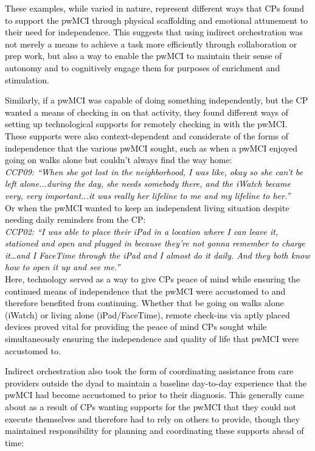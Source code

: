 \documentclass[acmsmall]{acmart}
\begin{document}
\textcolor{black}{These examples, while varied in nature, represent different ways that CPs found to support  the pwMCI through physical scaffolding and emotional attunement to their need for independence. This suggests that using indirect orchestration was not merely a means to achieve a task more efficiently through collaboration or prep work, but also a way to enable the pwMCI to maintain their sense of autonomy and to cognitively engage them for purposes of enrichment and stimulation.}

\textcolor{black}{Similarly, if a pwMCI was capable of doing something independently, but the CP wanted a means of checking in on that activity, they found different ways of setting up technological supports for remotely checking in with the pwMCI. These supports were also context-dependent and considerate of the forms of independence that the various pwMCI sought, such as when a pwMCI enjoyed going on walks alone but couldn’t always find the way home:}
\\

\textcolor{black}{\textit{CCP09: “When she got lost in the neighborhood, I was like, okay so she can’t be left alone...during the day, she needs somebody there, and the iWatch became very, very important...it was really her lifeline to me and my lifeline to her.”}}
\\ 

\textcolor{black}{Or when the pwMCI wanted to keep an independent living situation despite needing daily reminders from the CP:}
\\

\textcolor{black}{\textit{CCP02: “I was able to place their iPad in a location where I can leave it, stationed and open and plugged in because they're not gonna remember to charge it…and I FaceTime through the iPad and I almost do it daily. And they both know how to open it up and see me.”}}
\\

\textcolor{black}{Here, technology served as a way to give CPs peace of mind while ensuring the continued means of independence that the pwMCI were accustomed to and therefore benefited from continuing. Whether that be going on walks alone (iWatch) or living alone (iPad/FaceTime), remote check-ins via aptly placed devices proved vital for providing the peace of mind CPs sought while simultaneously ensuring the independence and quality of life that pwMCI were accustomed to.}

\textcolor{black}{Indirect orchestration also took the form of coordinating assistance \textcolor{black}{from} care \textcolor{black}{providers} outside the dyad to maintain  a baseline day-to-day experience that the pwMCI had become accustomed to prior to their diagnosis. \textcolor{black}{This} generally came about as a result of CPs wanting supports for the pwMCI that they could not execute themselves and therefore had to rely on others to provide, though they maintained responsibility for planning and coordinating these supports ahead of time:}
\\ 
\end{document}
